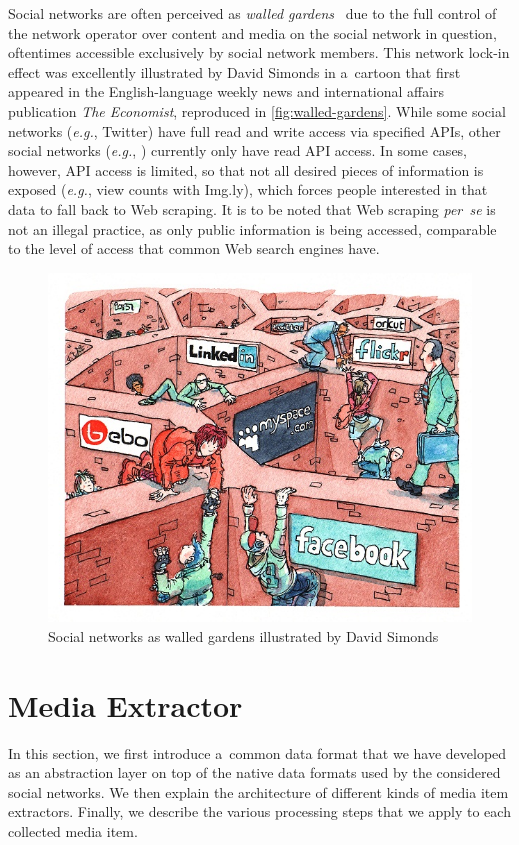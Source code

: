 Social networks are often perceived as
\emph{walled gardens}~\cite{simonds2008walledgarden}
due to the full control of the network operator
over content and media on the social network in question,
oftentimes accessible exclusively by social network members.
This network lock-in effect was excellently illustrated
by David Simonds in a~cartoon that first appeared
in the English-language weekly news and
international affairs publication \emph{The Economist},
reproduced in \autoref{fig:walled-gardens}.
While some social networks (\emph{e.g.}, Twitter)
have full read and write access via specified APIs,
other social networks (\emph{e.g.}, \googleplus)
currently only have read API access.
In some cases, however, API access is limited,
so that not all desired pieces of information is exposed
(\emph{e.g.}, view counts with Img.ly),
which forces people interested in that data
to fall back to Web scraping.
It is to be noted that Web scraping \emph{per~se}
is not an illegal practice, as only public information is being accessed,
comparable to the level of access that common Web search engines have.

\begin{figure}[!ht]
  \centering
  \includegraphics[width=0.7\linewidth,
    trim=16px 17px 12px 15px,clip]{davidsimonds.jpg}
  \caption[Social networks as walled
    gardens illustrated by David Simonds]
    {Social networks as walled gardens illustrated by David Simonds}
  \label{fig:walled-gardens}
\end{figure}

\section{Media Extractor}
\label{sec:media-extractor}

In this section, we first introduce a~common data format
that we have developed as an abstraction layer on top of the native
data formats used by the considered social networks.
We then explain the architecture
of different kinds of media item extractors.
Finally, we describe the various processing steps
that we apply to each collected media item.

